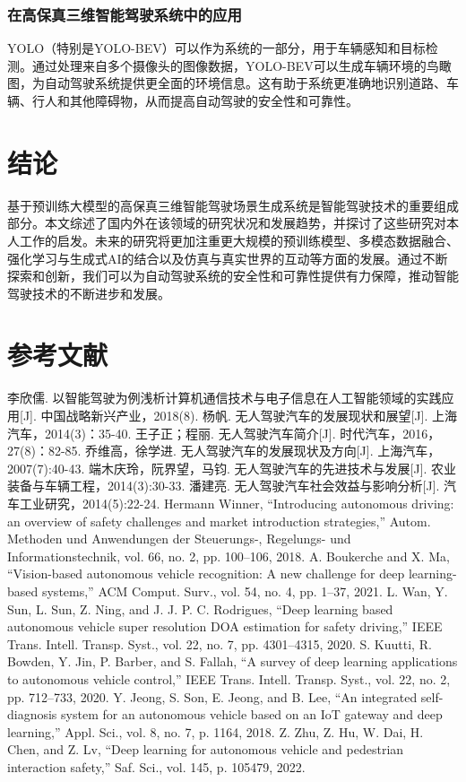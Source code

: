 \documentclass{article}
\begin{document}
\subsubsection*{在高保真三维智能驾驶系统中的应用}
YOLO（特别是YOLO-BEV）可以作为系统的一部分，用于车辆感知和目标检测。通过处理来自多个摄像头的图像数据，YOLO-BEV可以生成车辆环境的鸟瞰图，为自动驾驶系统提供更全面的环境信息。这有助于系统更准确地识别道路、车辆、行人和其他障碍物，从而提高自动驾驶的安全性和可靠性。

\section{结论}
基于预训练大模型的高保真三维智能驾驶场景生成系统是智能驾驶技术的重要组成部分。本文综述了国内外在该领域的研究状况和发展趋势，并探讨了这些研究对本人工作的启发。未来的研究将更加注重更大规模的预训练模型、多模态数据融合、强化学习与生成式AI的结合以及仿真与真实世界的互动等方面的发展。通过不断探索和创新，我们可以为自动驾驶系统的安全性和可靠性提供有力保障，推动智能驾驶技术的不断进步和发展。

\section{参考文献}
\renewcommand{\refname}{参考文献}
\begin{thebibliography}{}
 李欣儒. 以智能驾驶为例浅析计算机通信技术与电子信息在人工智能领域的实践应用[J]. 中国战略新兴产业，2018(8).
 杨帆. 无人驾驶汽车的发展现状和展望[J]. 上海汽车，2014(3)：35-40.
 王子正；程丽. 无人驾驶汽车简介[J]. 时代汽车，2016，27(8)：82-85.
 乔维高，徐学进. 无人驾驶汽车的发展现状及方向[J]. 上海汽车，2007(7):40-43.
 端木庆玲，阮界望，马钧. 无人驾驶汽车的先进技术与发展[J]. 农业装备与车辆工程，2014(3):30-33.
 潘建亮. 无人驾驶汽车社会效益与影响分析[J]. 汽车工业研究，2014(5):22-24.
 Hermann Winner, “Introducing autonomous driving: an overview of safety challenges and market introduction strategies,” Autom. Methoden und Anwendungen der Steuerungs-, Regelungs- und Informationstechnik, vol. 66, no. 2, pp. 100–106, 2018.
 A. Boukerche and X. Ma, “Vision-based autonomous vehicle recognition: A new challenge for deep learning-based systems,” ACM Comput. Surv., vol. 54, no. 4, pp. 1–37, 2021.
 L. Wan, Y. Sun, L. Sun, Z. Ning, and J. J. P. C. Rodrigues, “Deep learning based autonomous vehicle super resolution DOA estimation for safety driving,” IEEE Trans. Intell. Transp. Syst., vol. 22, no. 7, pp. 4301–4315, 2020.
 S. Kuutti, R. Bowden, Y. Jin, P. Barber, and S. Fallah, “A survey of deep learning applications to autonomous vehicle control,” IEEE Trans. Intell. Transp. Syst., vol. 22, no. 2, pp. 712–733, 2020.
 Y. Jeong, S. Son, E. Jeong, and B. Lee, “An integrated self-diagnosis system for an autonomous vehicle based on an IoT gateway and deep learning,” Appl. Sci., vol. 8, no. 7, p. 1164, 2018.
 Z. Zhu, Z. Hu, W. Dai, H. Chen, and Z. Lv, “Deep learning for autonomous vehicle and pedestrian interaction safety,” Saf. Sci., vol. 145, p. 105479, 2022.
\end{thebibliography}
\end{document}
